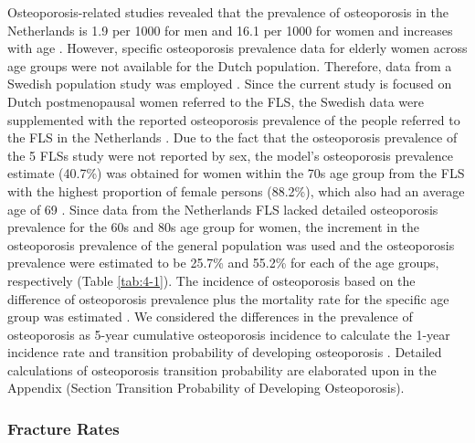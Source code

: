 Osteoporosis-related studies revealed that the prevalence of osteoporosis in the Netherlands is 1.9 per 1000 for men and 16.1 per 1000 for women and increases with age \cite{4-29,4-42}. However, specific osteoporosis prevalence data for elderly women across age groups were not available for the Dutch population. Therefore, data from a Swedish population study was employed \cite{4-43}. Since the current study is focused on Dutch postmenopausal women referred to the FLS, the Swedish data were supplemented with the reported osteoporosis prevalence of the people referred to the FLS in the Netherlands \cite{4-44}. Due to the fact that the osteoporosis prevalence of the 5 FLSs study were not reported by sex, the model's osteoporosis prevalence estimate (40.7\%) was obtained for women within the 70s age group from the FLS with the highest proportion of female persons (88.2\%), which also had an average age of 69 \cite{4-44}. Since data from the Netherlands FLS lacked detailed osteoporosis prevalence for the 60s and 80s age group for women, the increment in the osteoporosis prevalence of the general population was used and the osteoporosis prevalence were estimated to be 25.7\% and 55.2\% for each of the age groups, respectively (Table \ref{tab:4-1}). The incidence of osteoporosis based on the difference of osteoporosis prevalence plus the mortality rate for the specific age group was estimated \cite{4-45}. We considered the differences in the prevalence of osteoporosis as 5-year cumulative osteoporosis incidence to calculate the 1-year incidence rate and transition probability of developing osteoporosis \cite{4-46}. Detailed calculations of osteoporosis transition probability are elaborated upon in the Appendix (Section Transition Probability of Developing Osteoporosis).

\subsubsection{Fracture Rates}

